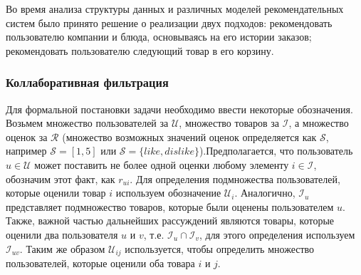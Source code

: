 Во время анализа структуры данных и различных моделей рекомендательных систем было
принято решение о реализации двух подходов: рекомендовать пользователю компании и
блюда, основываясь на его истории заказов; рекомендовать пользователю следующий
товар в его корзину.

\subsubsection{Коллаборативная фильтрация}

Для формальной постановки задачи необходимо ввести некоторые обозначения. Возьмем
множество пользователей за $\mathcal{U}$, множество товаров за $\mathcal{I}$, а
множество оценок за $\mathcal{R}$ (множество возможных значений оценок
определяется как $\mathcal{S}$, например $\mathcal{S}=[1,5]$ или
$\mathcal{S}=\{like, dislike\}$).Предполагается, что пользователь $u \in \mathcal{U}$
может поставить не более одной оценки любому элементу $i \in \mathcal{I}$,
обозначим этот факт, как $r_{ui}$. Для определения подмножества
пользователей, которые оценили товар $i$ используем обозначение $\mathcal{U}_i$.
Аналогично, $\mathcal{I}_u$ представляет подмножество товаров, которые были оценены
пользователем $u$. Также, важной частью дальнейших
рассуждений являются товары, которые оценили два пользователя $u$
и $v$, т.е. $\mathcal{I}_u \cap \mathcal{I}_v$, для этого определения
используем $\mathcal{I}_{uv}$. Таким же образом $\mathcal{U}_{ij}$ используется,
чтобы определить множество пользователей, которые оценили оба товара $i$ и $j$.

